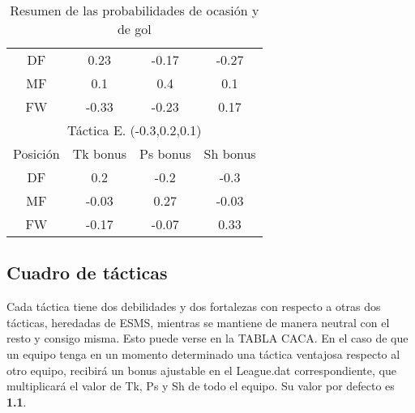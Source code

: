\documentclass[a4paper,9pt]{article}
\begin{document}
\begin{table}
\begin{center}
\begin{tabular}{c c c c}
      \hline
      DF & 0.23 & -0.17 & -0.27 \\
      MF & 0.1 & 0.4 & 0.1 \\
      FW & -0.33 & -0.23 & 0.17 \\
      \hline\hline
      \multicolumn{4}{c}{Táctica E. (-0.3,0.2,0.1)}\\
      \hline
      Posición & Tk bonus & Ps bonus & Sh bonus\\
      \hline
      DF & 0.2 & -0.2 & -0.3 \\
      MF & -0.03 & 0.27 & -0.03 \\
      FW & -0.17 & -0.07 & 0.33 \\
      \hline\hline
    \end{tabular}
  \end{center}
  \caption{Resumen de las probabilidades de ocasión y de gol}
  \label{table:tacticbonus}
\end{table}

\subsection{Cuadro de tácticas}\label{sec:CuadroTacticas}
\def \Cverde {\cellcolor{green}}
\def \Crojo {\cellcolor{red}}
\def \Cgris {\cellcolor[rgb]{0.8,0.8,0.8}}
\def \Cblanco {\cellcolor{white}}
Cada táctica tiene dos debilidades y dos fortalezas con respecto a otras dos tácticas, heredadas de ESMS, mientras se mantiene de manera neutral con el resto y consigo misma. Esto puede verse en la TABLA CACA. En el caso de que un equipo tenga en un momento determinado una táctica ventajosa respecto al otro equipo, recibirá un bonus ajustable en el League.dat correspondiente, que multiplicará el valor de Tk, Ps y Sh de todo el equipo. Su valor por defecto es \textbf{1.1}.
\end{document}
